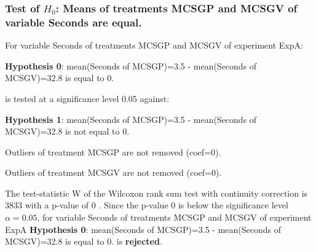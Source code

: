 \begin{frame}[t]
 \frametitle{Test of $H_{0}$: Means of treatments MCSGP and MCSGV of variable Seconds are equal. }
 \scriptsize
 For variable Seconds of treatments MCSGP and MCSGV of experiment ExpA:

\vspace{1mm}
{\bf Hypothesis 0}: mean(Seconds of MCSGP)=3.5 - mean(Seconds of MCSGV)=32.8 is equal to 0.


 \begin{center} is tested at a significance level 0.05 against: \end{center}

{\bf Hypothesis 1}: mean(Seconds of MCSGP)=3.5 - mean(Seconds of MCSGV)=32.8 is not equal to 0.
\vspace{1mm}
\vspace{1mm}

 Outliers of treatment MCSGP  are not removed (coef=0).

 Outliers of treatment MCSGV  are not removed (coef=0).
\vspace{1mm}
 
 The test-statistic W of the Wilcoxon rank sum test with continuity correction is 3833 with a p-value of 0 .
 Since the p-value 0 is below the significance level $\alpha= 0.05 $,
 for variable Seconds of treatments MCSGP and MCSGV of experiment ExpA 
 {\bf Hypothesis 0}: mean(Seconds of MCSGP)=3.5 - mean(Seconds of MCSGV)=32.8 is equal to 0.
is {\bf rejected}.

 \end{frame}
